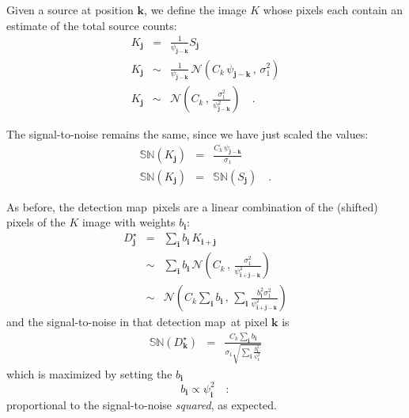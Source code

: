 \documentclass[letterpaper,preprint]{aastex62}
\newcommand{\detmap}{detection map}
\newcommand{\drawnfrom}{\sim}
\newcommand{\gaussianN}{\mathcal{N}}
\newcommand{\gaussian}[1]{\gaussianN\!\left(#1\right)}
\newcommand{\psf}{\psi}
\newcommand{\psfat}[1]{\psf_{#1}}
\newcommand{\snr}[1]{\mathbb{SN}(#1)}
\renewcommand{\vec}[1]{\boldsymbol{#1}}
\newcommand{\ivec}{\vec{i}}
\newcommand{\jvec}{\vec{j}}
\newcommand{\kvec}{\vec{k}}
\begin{document}
Given a source at position $\kvec$, we define the image $K$ whose
pixels each contain an estimate of the total source counts:
\begin{eqnarray}
  K_{\jvec} &=& \frac{1}{\psfat{\jvec-\kvec}} S_{\jvec}  \\
  K_{\jvec} &\drawnfrom& \frac{1}{\psfat{\jvec-\kvec}} \, \gaussian{C_k \, \psfat{\jvec-\kvec}\, , \, \sigma_1^2} \\
  K_{\jvec} &\drawnfrom& \gaussian{C_k \, , \, \frac{\sigma_1^2}{\psfat{\jvec-\kvec}^2}} \quad .
\end{eqnarray}

The signal-to-noise remains the same, since we have just scaled the
values:
\begin{eqnarray}
\snr{K_{\jvec}} &=& \frac{C_k \, \psfat{\jvec-\kvec}}{\sigma_1} \\
\snr{K_{\jvec}} &=& \snr{S_{\jvec}} \quad .
\end{eqnarray}


As before, the \detmap\ pixels are a linear combination of the
(shifted) pixels of the $K$ image with weights $b_{\ivec}$:
\begin{eqnarray}
D_{\jvec}^\star &=& \sum_{\ivec} b_{\ivec} \, K_{\ivec+\jvec} \\
&\drawnfrom& \sum_{\ivec} b_{\ivec} \, \gaussian{C_k \,,\, \frac{\sigma_1^2}{\psfat{\ivec+\jvec-\kvec}^2}} \\
&\drawnfrom& \gaussian{C_k \sum_{\ivec} b_{\ivec} \,,\, \sum_{\ivec} \frac{b_{\ivec}^2 \sigma_1^2}{\psfat{\ivec+\jvec-\kvec}^2}}
\end{eqnarray}
and the signal-to-noise in that \detmap\ at pixel $\kvec$ is
\begin{eqnarray}
\snr{D_{\kvec}^\star} &=& \frac{C_k \sum_{\ivec} b_{\ivec}}{\sigma_1 \sqrt{\sum_{\ivec} \frac{b_{\ivec}^2}{\psfat{\ivec}^2}}}
\end{eqnarray}
which is maximized by setting the $b_{\ivec}$
\begin{equation}
b_{\ivec} \propto \psfat{\ivec}^2 \quad :
\end{equation}
proportional to the signal-to-noise \emph{squared}, as expected.

%
%
%
%
\end{document}
